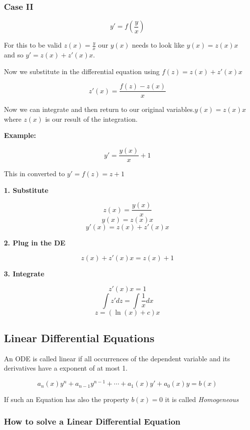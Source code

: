 \subsubsection{Case II}

\[y' = f(\frac{y}{x})\]

For this to be valid \(z(x) = \frac{y}{x}\) our \(y(x)\) needs to look like \(y(x) = z(x)x\) and so \(y' = z(x) + z'(x)x\).
\vspace{\baselineskip}

Now we substitute in the differential equation using \(f(z) = z(x) + z'(x)x\)

\[
z'(x) = \frac{f(z) - z(x)}{x}
\]

Now we can integrate and then return to our original variables.\(y(x) = z(x)x \) where \(z(x)\) is our
result of the integration.
\vspace{\baselineskip}

\textbf{Example:}
\vspace{\baselineskip}

\[y' = \frac{y(x)}{x} + 1\]

This in converted to \(y' = f(z) = z + 1\)
\vspace{\baselineskip}

\textbf{1. Substitute}

\[z(x) = \frac{y(x)}{x}\]
\[y(x) = z(x)x\]
\[y'(x) = z(x) + z'(x)x\]

\textbf{2. Plug in the DE}

\[z(x) + z'(x)x = z(x) + 1\]

\textbf{3. Integrate}

\[z'(x)x = 1\]
\[\int z' dz = \int \frac{1}{x} dx\]
\[z = (\ln(x) + c)x\]

\subsection{Linear Differential Equations}

An ODE is called linear if all occurrences of the dependent variable and its
derivatives have a exponent of at most 1.

\[a_n(x)y^n + a_{n - 1}y^{n -1} + \cdots + a_1(x)y' + a_0(x)y = b(x)\]

If such an Equation has also the property \(b(x) = 0\) it is called \emph{Homogeneous}

\subsubsection{How to solve a Linear Differential Equation}

